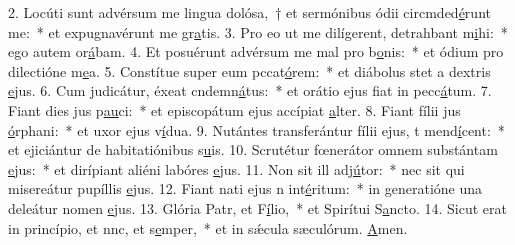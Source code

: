 2. Locúti sunt advérsum me lingua dolósa,~† et sermónibus ódii circmded\uline{é}runt me:~* et expugnavérunt me gr\uline{a}tis.
3. Pro eo ut me dilígerent, detrahbant m\uline{i}hi:~* ego autem or\uline{á}bam.
4. Et posuérunt advérsum me mal pro b\uline{o}nis:~* et ódium pro dilectióne m\uline{e}a.
5. Constítue super eum pccat\uline{ó}rem:~* et diábolus stet a dextris \uline{e}jus.
6. Cum judicátur, éxeat cndemn\uline{á}tus:~* et orátio ejus fiat in pecc\uline{á}tum.
7. Fiant dies jus p\uline{au}ci:~* et episcopátum ejus accípiat \uline{a}lter.
8. Fiant fílii jus \uline{ó}rphani:~* et uxor ejus v\uline{í}dua.
9. Nutántes transferántur fílii ejus, t mend\uline{í}cent:~* et ejiciántur de habitatiónibus s\uline{u}is.
10. Scrutétur fœnerátor omnem substántam \uline{e}jus:~* et dirípiant aliéni labóres \uline{e}jus.
11. Non sit ill adj\uline{ú}tor:~* nec sit qui misereátur pupíllis \uline{e}jus.
12. Fiant nati ejus n int\uline{é}ritum:~* in generatióne una deleátur nomen \uline{e}jus.
13. Glória Patr, et F\uline{í}lio,~* et Spirítui S\uline{a}ncto.
14. Sicut erat in princípio, et nnc, et s\uline{e}mper,~* et in sǽcula sæculórum. \uline{A}men.
